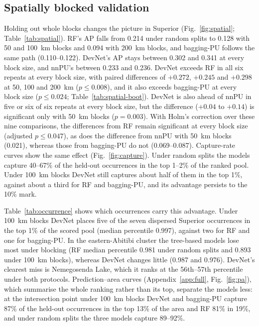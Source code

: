 \documentclass[pdflatex,sn-apa]{sn-jnl}
\begin{document}
\subsection{Spatially blocked validation}\label{sec:res-spatial}

Holding out whole blocks changes the picture in Superior (Fig.~\ref{fig:spatial}; Table~\ref{tab:spatial}). RF's AP falls from 0.214 under random splits to 0.128 with 50 and 100~km blocks and 0.094 with 200~km blocks, and bagging-PU follows the same path (0.110--0.122). DevNet's AP stays between 0.302 and 0.341 at every block size, and nnPU's between 0.233 and 0.236. DevNet exceeds RF in all six repeats at every block size, with paired differences of $+0.272$, $+0.245$ and $+0.298$ at 50, 100 and 200~km ($p \leq 0.008$), and it also exceeds bagging-PU at every block size ($p \leq 0.024$; Table~\ref{tab:spatial-boot}). DevNet is also ahead of nnPU in five or six of six repeats at every block size, but the difference ($+0.04$ to $+0.14$) is significant only with 50~km blocks ($p = 0.003$). With Holm's correction over these nine comparisons, the differences from RF remain significant at every block size (adjusted $p \leq 0.047$), as does the difference from nnPU with 50~km blocks (0.021), whereas those from bagging-PU do not (0.069--0.087). Capture-rate curves show the same effect (Fig.~\ref{fig:capture}). Under random splits the models capture 40--67\% of the held-out occurrences in the top 1--2\% of the ranked pool. Under 100~km blocks DevNet still captures about half of them in the top 1\%, against about a third for RF and bagging-PU, and its advantage persists to the 10\% mark.

Table~\ref{tab:occurrence} shows which occurrences carry this advantage. Under 100~km blocks DevNet places five of the seven dispersed Superior occurrences in the top 1\% of the scored pool (median percentile 0.997), against two for RF and one for bagging-PU. In the eastern-Abitibi cluster the tree-based models lose most under blocking (RF median percentile 0.981 under random splits and 0.893 under 100~km blocks), whereas DevNet changes little (0.987 and 0.976). DevNet's clearest miss is Nemegosenda Lake, which it ranks at the 56th--57th percentile under both protocols. Prediction--area curves (Appendix~\ref{app:full}, Fig.~\ref{fig:pa}), which summarise the whole ranking rather than its top, separate the models less: at the intersection point under 100~km blocks DevNet and bagging-PU capture 87\% of the held-out occurrences in the top 13\% of the area and RF 81\% in 19\%, and under random splits the three models capture 89--92\%.
\end{document}
